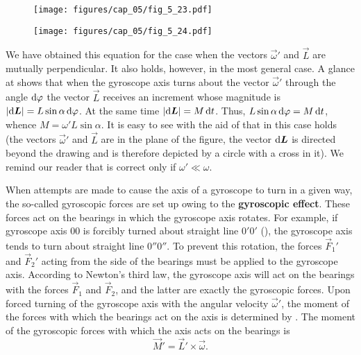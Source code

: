 \begin{figure}[t]
	\begin{minipage}[t]{0.55\linewidth}
		\begin{center}
			\texttt{[image: figures/cap\_05/fig\_5\_23.pdf]}
			\caption[]{}
			\label{fig:5_23}
		\end{center}
	\end{minipage}
	\hspace{-0.05cm}
	\begin{minipage}[t]{0.45\linewidth}
		\begin{center}
			\texttt{[image: figures/cap\_05/fig\_5\_24.pdf]}
			\caption[]{}
			\label{fig:5_24}
		\end{center}
	\end{minipage}
	\vspace{-0.65cm}
\end{figure}

\noindent
We have obtained this equation for the case when the vectors $\vec{\omega}'$ and $\vec{L}$ are mutually perpendicular. It also holds, however, in the most general case. A glance at  shows that when the gyroscope axis turns about the vector $\vec{\omega}'$ through the angle $\mathrm{d}\varphi$ the vector $\vec{L}$ receives an increment whose magnitude is $|\mathrm{d}\boldsymbol{L}|=L\sin\alpha\,\mathrm{d}\varphi$. At the same time $|\mathrm{d}\boldsymbol{L}|=M\,\mathrm{d} t$. Thus, $L\sin\alpha\,\mathrm{d}\varphi=M\,\mathrm{d} t$, whence $M=\omega'L\sin\alpha$. It is easy to see with the aid of  that in this case  holds (the vectors $\vec{\omega}'$ and $\vec{L}$ are in the plane of the figure, the vector $\mathrm{d}\boldsymbol{L}$ is directed beyond the drawing and is therefore depicted by a circle with a cross in it). We remind our reader that  is correct only if $\omega'\ll\omega$.

When attempts are made to cause the axis of a gyroscope to turn in a given way, the so-called gyroscopic forces are set up owing to the \textbf{gyroscopic effect}. These forces act on the bearings in which the gyroscope axis rotates. For example, if gyroscope axis $00$ is forcibly turned about straight line $0'0'$ (), the gyroscope axis tends to turn about straight line $0''0''$. To prevent this rotation, the forces $\vec{F}_1'$ and $\vec{F}_2'$ acting from the side of the bearings must be applied to the gyroscope axis. According to Newton's third law, the gyroscope axis will act on the bearings with the forces $\vec{F}_1$ and $\vec{F}_2$, and the latter are exactly the gyroscopic forces. Upon forced turning of the gyroscope axis with the angular velocity $\vec{\omega}'$, the moment of the forces with which the bearings act on the axis is determined by . The moment of the gyroscopic forces with which the axis acts on the bearings is
\begin{equation}\label{eq:5_70}
	\vec{M}' = \vec{L}' \times \vec{\omega}.
\end{equation}

